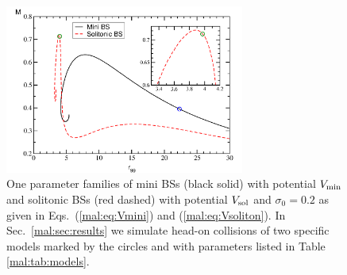 %
\begin{figure}[h!]
    \centering
    \includegraphics[width=0.7\textwidth]{malaise_source/statBS.pdf}
    \caption{One parameter families of mini BSs (black solid) with
    potential ${V}_{\rm min}$ and solitonic
    BSs (red dashed) with potential ${V}_{\rm sol}$ and
    ${\sigma}_0=0.2$ {as given in Eqs.~(\ref{mal:eq:Vmini}) and (\ref{mal:eq:Vsoliton})}. In
    Sec.~\ref{mal:sec:results} we simulate head-on collisions of two
    specific models marked by the circles and with parameters listed
    in Table \ref{mal:tab:models}.
    }
    \label{mal:fig:statBS}
\end{figure}
%


